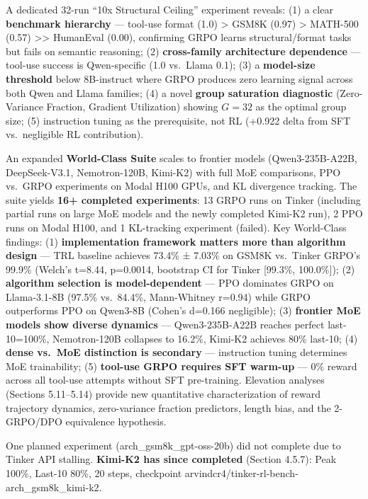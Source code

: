\documentclass[
  american,
  11pt,
  a4paper,
  oneside]{report}
\begin{document}
A dedicated 32-run ``10x Structural Ceiling'' experiment reveals: (1) a
clear \textbf{benchmark hierarchy} --- tool-use format (1.0)
\textgreater{} GSM8K (0.97) \textgreater{} MATH-500 (0.57)
\textgreater\textgreater{} HumanEval (0.00), confirming GRPO learns
structural/format tasks but fails on semantic reasoning; (2)
\textbf{cross-family architecture dependence} --- tool-use success is
Qwen-specific (1.0 vs.~Llama 0.1); (3) a \textbf{model-size threshold}
below 8B-instruct where GRPO produces zero learning signal across both
Qwen and Llama families; (4) a novel \textbf{group saturation
diagnostic} (Zero-Variance Fraction, Gradient Utilization) showing
\(G{=}32\) as the optimal group size; (5) instruction tuning as the
prerequisite, not RL (+0.922 delta from SFT vs.~negligible RL
contribution).

An expanded \textbf{World-Class Suite} scales to frontier models
(Qwen3-235B-A22B, DeepSeek-V3.1, Nemotron-120B, Kimi-K2) with full MoE
comparisons, PPO vs.~GRPO experiments on Modal H100 GPUs, and KL
divergence tracking. The suite yields \textbf{16+ completed
experiments}: 13 GRPO runs on Tinker (including partial runs on large
MoE models and the newly completed Kimi-K2 run), 2 PPO runs on Modal
H100, and 1 KL-tracking experiment (failed). Key World-Class findings:
(1) \textbf{implementation framework matters more than algorithm design}
--- TRL baseline achieves 73.4\% ± 7.03\% on GSM8K vs.~Tinker GRPO's
99.9\% (Welch's t=8.44, p=0.0014, bootstrap CI for Tinker {[}99.3\%,
100.0\%{]}); (2) \textbf{algorithm selection is model-dependent} --- PPO
dominates GRPO on Llama-3.1-8B (97.5\% vs.~84.4\%, Mann-Whitney r=0.94)
while GRPO outperforms PPO on Qwen3-8B (Cohen's d=0.166 negligible); (3)
\textbf{frontier MoE models show diverse dynamics} --- Qwen3-235B-A22B
reaches perfect last-10=100\%, Nemotron-120B collapses to 16.2\%,
Kimi-K2 achieves 80\% last-10; (4) \textbf{dense vs.~MoE distinction is
secondary} --- instruction tuning determines MoE trainability; (5)
\textbf{tool-use GRPO requires SFT warm-up} --- 0\% reward across all
tool-use attempts without SFT pre-training. Elevation analyses (Sections
5.11--5.14) provide new quantitative characterization of reward
trajectory dynamics, zero-variance fraction predictors, length bias, and
the 2-GRPO/DPO equivalence hypothesis.

One planned experiment (arch\_gsm8k\_gpt-oss-20b) did not complete due
to Tinker API stalling. \textbf{Kimi-K2 has since completed} (Section
4.5.7): Peak 100\%, Last-10 80\%, 20 steps, checkpoint
arvindcr4/tinker-rl-bench-arch\_gsm8k\_kimi-k2.
\end{document}
